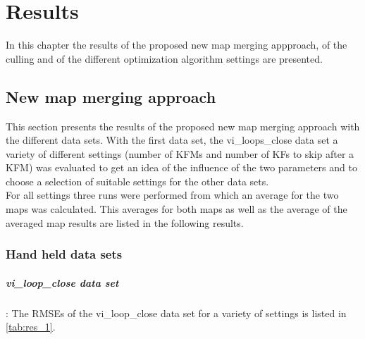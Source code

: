\chapter{Results}
\label{chap:results}

In this chapter the results of the proposed new map merging appproach, of the culling and of the different optimization algorithm settings are presented.

\section{New map merging approach}
This section presents the results of the proposed new map merging approach with the different data sets. With the first data set, the vi\_loops\_close data set a variety of different settings (number of \acp{KFM} and number of \acp{KF} to skip after a \ac{KFM}) was evaluated to get an idea of the influence of the two parameters and to choose a selection of suitable settings for the other data sets.\\

For all settings three runs were performed from which an average for the two maps was calculated. This averages for both maps as well as the average of the averaged map results are listed in the following results.

\subsection{Hand held data sets}

\paragraph{vi\_loop\_close data set}: The \acp{RMSE} of the vi\_loop\_close data set for a variety of settings is listed in \autoref{tab:res_1}.

